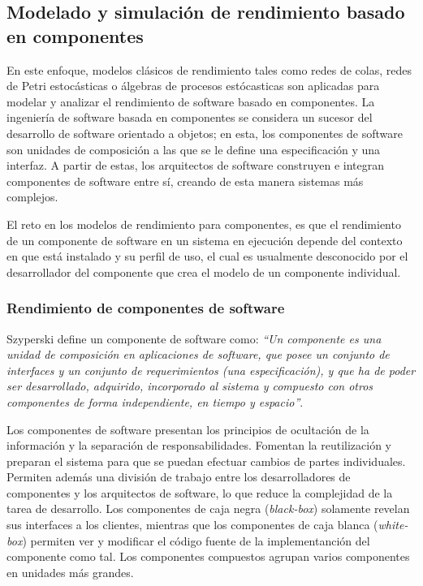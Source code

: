 \subsection{Modelado y simulación de rendimiento basado en componentes}
En este enfoque, modelos clásicos de rendimiento tales como redes de colas, redes de Petri estocásticas o álgebras de procesos estócasticas son aplicadas para modelar y analizar el rendimiento de software basado en componentes. La ingeniería de software basada en componentes se considera un sucesor del desarrollo de software orientado a objetos; en esta, los componentes de software son unidades de composición a las que se le define una especificación y una interfaz. A partir de estas, los arquitectos de software construyen e integran componentes de software entre sí, creando de esta manera sistemas más complejos.\cite{Koziolek:2010:PEC:1808359.1808729}

El reto en los modelos de rendimiento para componentes, es que el rendimiento de un componente de software en un sistema en ejecución depende del contexto en que está instalado y su perfil de uso, el cual es usualmente desconocido por el desarrollador del componente que crea el modelo de un componente individual.

\subsubsection{Rendimiento de componentes de software}
Szyperski\cite{Szyperski:2002:CSB:515228} define un componente de software como: \textit{``Un componente es una unidad de composición en aplicaciones de software, que posee un conjunto de interfaces y un conjunto de requerimientos (una especificación), y que ha de poder ser desarrollado, adquirido, incorporado al sistema y compuesto con otros componentes de forma independiente, en tiempo y espacio''}. 

Los componentes de software presentan los principios de ocultación de la información y la separación de responsabilidades. Fomentan la reutilización y preparan el sistema para que se puedan efectuar cambios de partes individuales. Permiten además una división de trabajo entre los desarrolladores de componentes y los arquitectos de software, lo que reduce la complejidad de la tarea de desarrollo. Los componentes de caja negra (\emph{black-box}) solamente revelan sus interfaces a los clientes, mientras que los componentes de caja blanca (\emph{white-box}) permiten ver y modificar el código fuente de la implementanción del componente como tal. Los componentes compuestos agrupan varios componentes en unidades más grandes.

